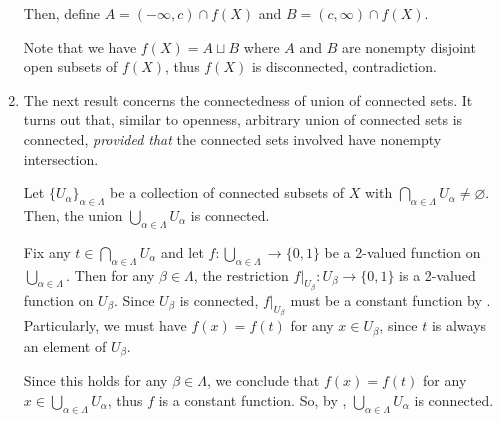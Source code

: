 \begin{enumerate}
\begin{pf}
Then, define \(A=(-\infty,c)\cap f(X)\) and \(B=(c,\infty)\cap f(X)\).
\begin{center}
\end{center}
Note that we have \(f(X)=A\sqcup B\) where \(A\) and \(B\) are nonempty
disjoint open subsets of \(f(X)\), thus \(f(X)\) is disconnected,
contradiction.
\end{pf}

\item The next result concerns the connectedness of union of connected sets. It
turns out that, similar to openness, arbitrary union of connected sets is
connected, \emph{provided that} the connected sets involved have nonempty
intersection.
\begin{proposition}
\label{prp:conn-union-nonemp-int-conn}
Let \(\{U_{\alpha}\}_{\alpha\in\Lambda}\) be a collection of connected
subsets of \(X\) with \(\bigcap_{\alpha\in\Lambda}U_{\alpha}\ne\varnothing\).
Then, the union \(\bigcup_{\alpha\in\Lambda}U_{\alpha}\) is connected.
\end{proposition}
\begin{pf}
Fix any \(t\in\bigcap_{\alpha\in\Lambda}U_{\alpha}\) and let
\(f:\bigcup_{\alpha\in\Lambda}\to\{0,1\}\) be a 2-valued function on
\(\bigcup_{\alpha\in\Lambda}\). Then for any \(\beta\in\Lambda\), the
restriction \(f|_{U_{\beta}}:U_{\beta}\to\{0,1\}\) is a 2-valued function on
\(U_{\beta}\). Since \(U_{\beta}\) is connected, \(f|_{U_{\beta}}\) must be a
constant function by . Particularly, we must have
\(f(x)=f(t)\) for any \(x\in U_{\beta}\), since \(t\) is always an element of
\(U_{\beta}\).

Since this holds for any \(\beta\in\Lambda\), we conclude that \(f(x)=f(t)\)
for any \(x\in\bigcup_{\alpha\in\Lambda}U_{\alpha}\), thus \(f\) is a constant
function. So, by , \(\bigcup_{\alpha\in\Lambda}U_{\alpha}\)
is connected.
\end{pf}


\end{enumerate}
